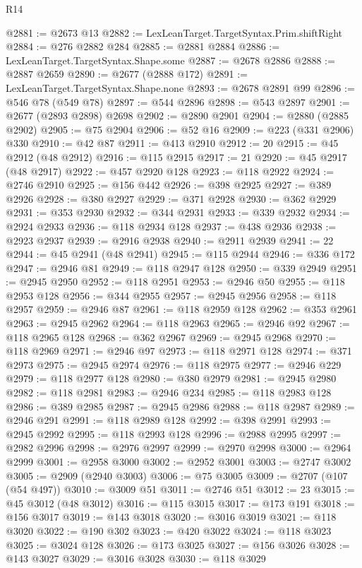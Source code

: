 \begin{lexlean}{R14}
\begin{coremodule}
{{{{{{{{{{{{{{{{{{{{{{{{{{{{{{{{{{{{{{{{{{{{{{{{{{{{{{{{{{{{{{{{{{{{{{{{{{{{{{{{{{@2881 := @2673 @13
@2882 := LexLeanTarget.TargetSyntax.Prim.shiftRight
@2884 := @276 @2882 @284
@2885 := @2881 @2884
@2886 := LexLeanTarget.TargetSyntax.Shape.some
@2887 := @2678 @2886
@2888 := @2887 @2659
@2890 := @2677 (@2888 @172)
@2891 := LexLeanTarget.TargetSyntax.Shape.none
@2893 := @2678 @2891 @99
@2896 := @546 @78 (@549 @78)
@2897 := @544 @2896
@2898 := @543 @2897
@2901 := @2677 (@2893 @2898) @2698
@2902 := @2890 @2901
@2904 := @2880 (@2885 @2902)
@2905 := @75 @2904
@2906 := @52 @16
@2909 := @223 (@331 @2906) @330
@2910 := @42 @87
@2911 := @413 @2910
@2912 := 20
@2915 := @45 @2912 (@48 @2912)
@2916 := @115 @2915
@2917 := 21
@2920 := @45 @2917 (@48 @2917)
@2922 := @457 @2920 @128
@2923 := @118 @2922
@2924 := @2746 @2910
@2925 := @156 @442
@2926 := @398 @2925
@2927 := @389 @2926
@2928 := @380 @2927
@2929 := @371 @2928
@2930 := @362 @2929
@2931 := @353 @2930
@2932 := @344 @2931
@2933 := @339 @2932
@2934 := @2924 @2933
@2936 := @118 @2934 @128
@2937 := @438 @2936
@2938 := @2923 @2937
@2939 := @2916 @2938
@2940 := @2911 @2939
@2941 := 22
@2944 := @45 @2941 (@48 @2941)
@2945 := @115 @2944
@2946 := @336 @172
@2947 := @2946 @81
@2949 := @118 @2947 @128
@2950 := @339 @2949
@2951 := @2945 @2950
@2952 := @118 @2951
@2953 := @2946 @50
@2955 := @118 @2953 @128
@2956 := @344 @2955
@2957 := @2945 @2956
@2958 := @118 @2957
@2959 := @2946 @87
@2961 := @118 @2959 @128
@2962 := @353 @2961
@2963 := @2945 @2962
@2964 := @118 @2963
@2965 := @2946 @92
@2967 := @118 @2965 @128
@2968 := @362 @2967
@2969 := @2945 @2968
@2970 := @118 @2969
@2971 := @2946 @97
@2973 := @118 @2971 @128
@2974 := @371 @2973
@2975 := @2945 @2974
@2976 := @118 @2975
@2977 := @2946 @229
@2979 := @118 @2977 @128
@2980 := @380 @2979
@2981 := @2945 @2980
@2982 := @118 @2981
@2983 := @2946 @234
@2985 := @118 @2983 @128
@2986 := @389 @2985
@2987 := @2945 @2986
@2988 := @118 @2987
@2989 := @2946 @291
@2991 := @118 @2989 @128
@2992 := @398 @2991
@2993 := @2945 @2992
@2995 := @118 @2993 @128
@2996 := @2988 @2995
@2997 := @2982 @2996
@2998 := @2976 @2997
@2999 := @2970 @2998
@3000 := @2964 @2999
@3001 := @2958 @3000
@3002 := @2952 @3001
@3003 := @2747 @3002
@3005 := @2909 (@2940 @3003)
@3006 := @75 @3005
@3009 := @2707 (@107 (@54 @497))
@3010 := @3009 @51
@3011 := @2746 @51
@3012 := 23
@3015 := @45 @3012 (@48 @3012)
@3016 := @115 @3015
@3017 := @173 @191
@3018 := @156 @3017
@3019 := @143 @3018
@3020 := @3016 @3019
@3021 := @118 @3020
@3022 := @190 @302
@3023 := @420 @3022
@3024 := @118 @3023
@3025 := @3024 @128
@3026 := @173 @3025
@3027 := @156 @3026
@3028 := @143 @3027
@3029 := @3016 @3028
@3030 := @118 @3029
}}}}}}}}}}}}}}}}}}}}}}}}}}}}}}}}}}}}}}}}}}}}}}}}}}}}}}}}}}}}}}}}}}}}}}}}}}}}}}}}}}
\end{coremodule}
\end{lexlean}
